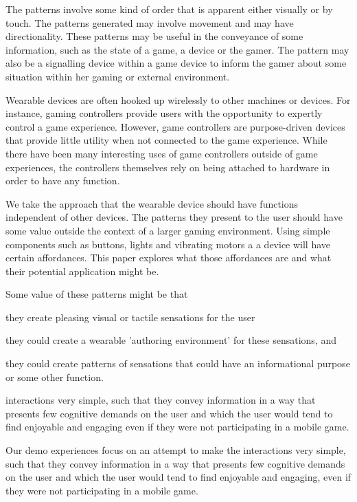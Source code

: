 \documentclass{chi-ext}
\begin{document}
The patterns involve some kind of order that is apparent either visually or by touch. The patterns generated may involve movement and may have directionality. These patterns may be useful in the conveyance of some information, such as the state of a game, a device or the gamer. The pattern may also be a signalling device within a game device to inform the gamer about some situation within her gaming or external environment.

Wearable devices are often hooked up wirelessly to other machines or devices. For instance, gaming controllers provide users with the opportunity to expertly control a game experience. However, game controllers are purpose-driven devices that provide little utility when not connected to the game experience. While there have been many interesting uses of game controllers outside of game experiences, the controllers themselves rely on being attached to hardware in order to have any function. 

We take the approach that the wearable device should have functions independent of other devices. The patterns they present to the user should have some value outside the context of a larger gaming environment. Using simple components such as buttons, lights and vibrating motors a a device will have certain affordances. This paper explores what those affordances are and what their potential application might be. 

Some value of these patterns might be that 
\begin{inparaenum}
\item they create pleasing visual or tactile sensations for the user
\item they could create a wearable 'authoring environment' for these sensations, and
\item they could create patterns of sensations that could have an informational purpose or some other function. 
\end{inparaenum}

interactions very simple, such that they convey information in a way that presents few cognitive demands on the user and which the user would tend to find enjoyable and engaging even if they were not participating in a mobile game. 

Our demo experiences focus on an attempt to make the interactions very simple, such that they convey information in a way that presents few cognitive demands on the user and which the user would tend to find enjoyable and engaging, even if they were not participating in a mobile game. 
\end{document}
